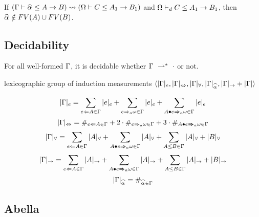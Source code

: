 \begin{lemma}
If $(\Gm \vdash \al \le A \to B) \sto (\Om \vdash C \le A_1 \to B_1)$ and $\Omega \vdash_d C \le A_1 \to B_1$,
then $\al\notin FV(A) \cup FV(B)$.
\end{lemma}

\subsection{Decidability}
\begin{theorem}[Decidability]
For all well-formed $\Gamma$, it is decidable whether $\Gamma~\rightharpoonup^*~\cdot$ or not.
\end{theorem}

lexicographic group of induction measurements
$\langle |\Gm|_e, |\Gm|_\Leftrightarrow, |\Gm|_\forall, |\Gm|_{\al}, |\Gm|_\to + |\Gm| \rangle$

\begin{definition}
\[|\Gm|_e = \sum_{e\Lto A\in\Gm}|e|_e + \sum_{e\To_a \jg\in\Gm}|e|_e + \sum_{\appInfAlg{A}{e}\in\Gm}|e|_e\]
\[|\Gm|_\Leftrightarrow = \#_{e\Lto A\in\Gm}
    + 2\cdot\#_{e\To_a \jg\in\Gm} + 3\cdot\#_{\appInfAlg{A}{e}\in\Gm}\]
\[|\Gm|_\forall = \sum_{e\Lto A\in\Gm}|A|_\forall + \sum_{\appInfAlg{A}{e}\in\Gm}|A|_\forall +
    \sum_{A\le B\in\Gm} |A|_\forall + |B|_\forall\]
\[|\Gm|_\to = \sum_{e\Lto A\in\Gm}|A|_\to + \sum_{\appInfAlg{A}{e}\in\Gm}|A|_\to +
    \sum_{A\le B\in\Gm} |A|_\to + |B|_\to\]
\[|\Gm|_{\al} = \#_{\al\in\Gm}\]
\end{definition}

\subsection{Abella}
